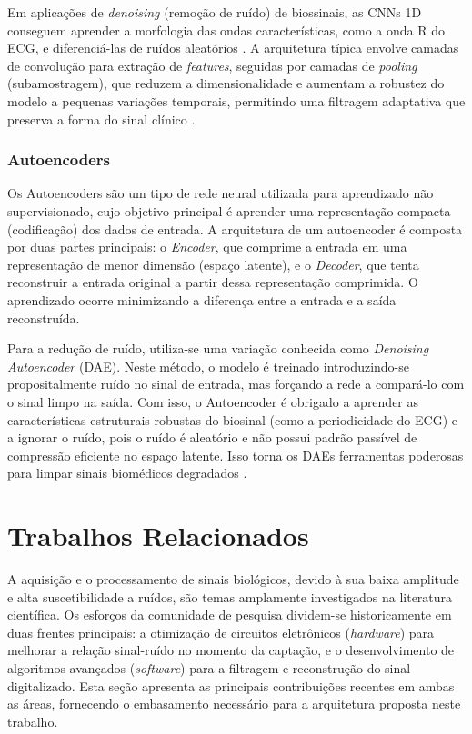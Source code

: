 \documentclass[tcc,capa]{texufpel}
\begin{document}
Em aplicações de \textit{denoising} (remoção de ruído) de biossinais, as CNNs 1D conseguem aprender a morfologia das ondas características, como a onda R do ECG, e diferenciá-las de ruídos aleatórios \cite{lomoio2024}. A arquitetura típica envolve camadas de convolução para extração de \textit{features}, seguidas por camadas de \textit{pooling} (subamostragem), que reduzem a dimensionalidade e aumentam a robustez do modelo a pequenas variações temporais, permitindo uma filtragem adaptativa que preserva a forma do sinal clínico \cite{goodfellow2016, lomoio2024}.

\subsection{Autoencoders}

Os Autoencoders são um tipo de rede neural utilizada para aprendizado não supervisionado, cujo objetivo principal é aprender uma representação compacta (codificação) dos dados de entrada. A arquitetura de um autoencoder é composta por duas partes principais: o \textit{Encoder}, que comprime a entrada em uma representação de menor dimensão (espaço latente), e o \textit{Decoder}, que tenta reconstruir a entrada original a partir dessa representação comprimida. O aprendizado ocorre minimizando a diferença entre a entrada e a saída reconstruída.

Para a redução de ruído, utiliza-se uma variação conhecida como \textit{Denoising Autoencoder} (DAE). Neste método, o modelo é treinado introduzindo-se propositalmente ruído no sinal de entrada, mas forçando a rede a compará-lo com o sinal limpo na saída. Com isso, o Autoencoder é obrigado a aprender as características estruturais robustas do biosinal (como a periodicidade do ECG) e a ignorar o ruído, pois o ruído é aleatório e não possui padrão passível de compressão eficiente no espaço latente. Isso torna os DAEs ferramentas poderosas para limpar sinais biomédicos degradados \cite{lomoio2024}.
\chapter{Trabalhos Relacionados}
\label{chap:trabalhos_relacionados}

A aquisição e o processamento de sinais biológicos, devido à sua baixa amplitude e alta suscetibilidade a ruídos, são temas amplamente investigados na literatura científica. Os esforços da comunidade de pesquisa dividem-se historicamente em duas frentes principais: a otimização de circuitos eletrônicos (\textit{hardware}) para melhorar a relação sinal-ruído no momento da captação, e o desenvolvimento de algoritmos avançados (\textit{software}) para a filtragem e reconstrução do sinal digitalizado. Esta seção apresenta as principais contribuições recentes em ambas as áreas, fornecendo o embasamento necessário para a arquitetura proposta neste trabalho.
\end{document}
